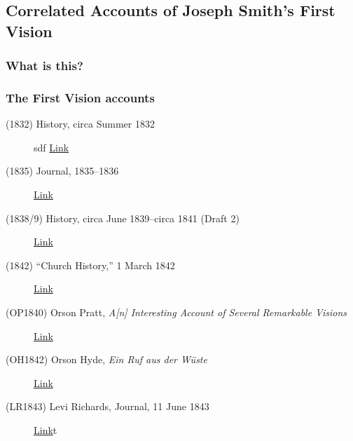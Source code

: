\subsection{Correlated Accounts of Joseph Smith's First Vision}
	\label{DOCS-FIRSTVISION}
	
	\subsubsection{What is this?}
	
	\subsubsection{The First Vision accounts}
	
		\begin{description}
		
			\item[(1832) History, circa Summer 1832] sdf
				\href{https://www.josephsmithpapers.org/paper-summary/history-circa-summer-1832/1?p=1}{Link}
			
			\item[(1835) Journal, 1835--1836]
				\href{https://www.josephsmithpapers.org/paper-summary/journal-1835-1836/24?p=24}{Link}
			
			\item[(1838/9) History, circa June 1839--circa 1841 (Draft 2)]
				\href{https://www.josephsmithpapers.org/paper-summary/history-circa-june-1839-circa-1841-draft-2/2?p=2}{Link}
				
			\item[(1842) ``Church History,'' 1 March 1842]
				\href{https://www.josephsmithpapers.org/paper-summary/church-history-1-march-1842/1?p=1}{Link}
				
			\item[(OP1840) Orson Pratt, \textit{A[n] Interesting Account of Several Remarkable Visions}]
				\href{https://www.josephsmithpapers.org/paper-summary/appendix-orson-pratt-an-interesting-account-of-several-remarkable-visions-1840/3?p=3}{Link}
				
			\item[(OH1842) Orson Hyde, \textit{Ein Ruf aus der Wüste}]
				\href{https://www.josephsmithpapers.org/paper-summary/orson-hyde-ein-ruf-aus-der-wste-a-cry-out-of-the-wilderness-1842-extract-english-translation/1}{Link}
				
			\item[(LR1843) Levi Richards, Journal, 11 June 1843]
				\href{https://www.josephsmithpapers.org/paper-summary/levi-richards-journal-11-june-1843-extract/1}{Link}t
				

\end{description}
